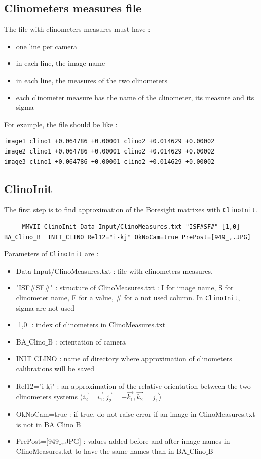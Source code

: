 \subsection{Clinometers measures file}

The file with clinometers measures must have :
\begin{itemize}
     \item one line per camera
     \item in each line, the image name
     \item in each line, the measures of the two clinometers
     \item each clinometer measure has the name of the clinometer, its measure and its sigma  
\end{itemize}

For example, the file should be like :

\begin{lstlisting}
image1 clino1 +0.064786 +0.00001 clino2 +0.014629 +0.00002
image2 clino1 +0.064786 +0.00001 clino2 +0.014629 +0.00002
image3 clino1 +0.064786 +0.00001 clino2 +0.014629 +0.00002
\end{lstlisting}



\subsection{ClinoInit}

The first step is to find approximation of the Boresight matrixes with {\tt ClinoInit}.

\begin{lstlisting}
     MMVII ClinoInit Data-Input/ClinoMeasures.txt "ISF#SF#" [1,0] BA_Clino_B  INIT_CLINO Rel12="i-kj" OkNoCam=true PrePost=[949_,.JPG]
\end{lstlisting}


Parameters of {\tt ClinoInit} are :
\begin{itemize}
     \item Data-Input/ClinoMeasures.txt : file with clinometers measures.
     \item "ISF\#SF\#" : structure of ClinoMeasures.txt : I for image name, S for clinometer name, F for a value, \# for a not used column. In {\tt ClinoInit}, sigma are not used
     \item $[$1,0$]$ : index of clinometers in ClinoMeasures.txt
     \item BA$\_$Clino$\_$B : orientation of camera
     \item INIT$\_$CLINO : name of directory where approximation of clinometers calibrations will be saved
     \item Rel12="i-kj" : an approximation of the relative orientation between the two clinometers systems ($\Vec{i_2}=\Vec{i_1}, \Vec{j_2}=-\Vec{k_1}, \Vec{k_2}=\Vec{j_1}$)
     \item OkNoCam=true : if true, do not raise error if an image in ClinoMeasures.txt is not in BA$\_$Clino$\_$B
     \item PrePost=[949$\_$,.JPG] : values added before and after image names in ClinoMeasures.txt to have the same names than in BA$\_$Clino$\_$B
\end{itemize}

